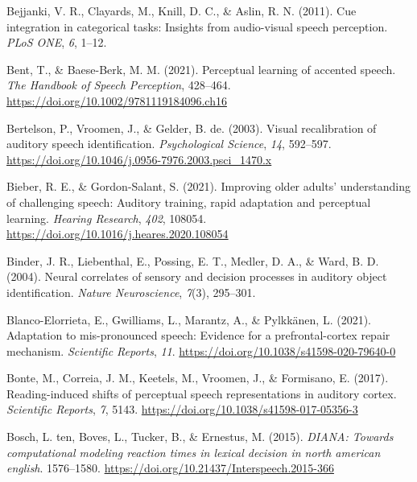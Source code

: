 \documentclass[
  11pt,
  man,floatsintext]{apa6}
\newlength{\cslhangindent}
\newlength{\cslentryspacingunit} %
\newenvironment{CSLReferences}[2] %
 {%
  \setlength{\parindent}{0pt}
  \ifodd #1
  \let\oldpar\par
  \def\par{\hangindent=\cslhangindent\oldpar}
  \fi
  \setlength{\parskip}{#2\cslentryspacingunit}
 }%
 {}
\begin{document}
\begin{CSLReferences}{1}{0}
\leavevmode{}%
Bejjanki, V. R., Clayards, M., Knill, D. C., \& Aslin, R. N. (2011). Cue integration in categorical tasks: Insights from audio-visual speech perception. \emph{PLoS ONE}, \emph{6}, 1--12.

\leavevmode{}%
Bent, T., \& Baese-Berk, M. M. (2021). Perceptual learning of accented speech. \emph{The Handbook of Speech Perception}, 428--464. \url{https://doi.org/10.1002/9781119184096.ch16}

\leavevmode{}%
Bertelson, P., Vroomen, J., \& Gelder, B. de. (2003). Visual recalibration of auditory speech identification. \emph{Psychological Science}, \emph{14}, 592--597. \url{https://doi.org/10.1046/j.0956-7976.2003.psci_1470.x}

\leavevmode{}%
Bieber, R. E., \& Gordon-Salant, S. (2021). Improving older adults' understanding of challenging speech: Auditory training, rapid adaptation and perceptual learning. \emph{Hearing Research}, \emph{402}, 108054. \url{https://doi.org/10.1016/j.heares.2020.108054}

\leavevmode{}%
Binder, J. R., Liebenthal, E., Possing, E. T., Medler, D. A., \& Ward, B. D. (2004). Neural correlates of sensory and decision processes in auditory object identification. \emph{Nature Neuroscience}, \emph{7}(3), 295--301.

\leavevmode{}%
Blanco-Elorrieta, E., Gwilliams, L., Marantz, A., \& Pylkkänen, L. (2021). Adaptation to mis-pronounced speech: Evidence for a prefrontal-cortex repair mechanism. \emph{Scientific Reports}, \emph{11}. \url{https://doi.org/10.1038/s41598-020-79640-0}

\leavevmode{}%
Bonte, M., Correia, J. M., Keetels, M., Vroomen, J., \& Formisano, E. (2017). Reading-induced shifts of perceptual speech representations in auditory cortex. \emph{Scientific Reports}, \emph{7}, 5143. \url{https://doi.org/10.1038/s41598-017-05356-3}

\leavevmode{}%
Bosch, L. ten, Boves, L., Tucker, B., \& Ernestus, M. (2015). \emph{DIANA: Towards computational modeling reaction times in lexical decision in north american english}. 1576--1580. \url{https://doi.org/10.21437/Interspeech.2015-366}


\end{CSLReferences}
\end{document}
